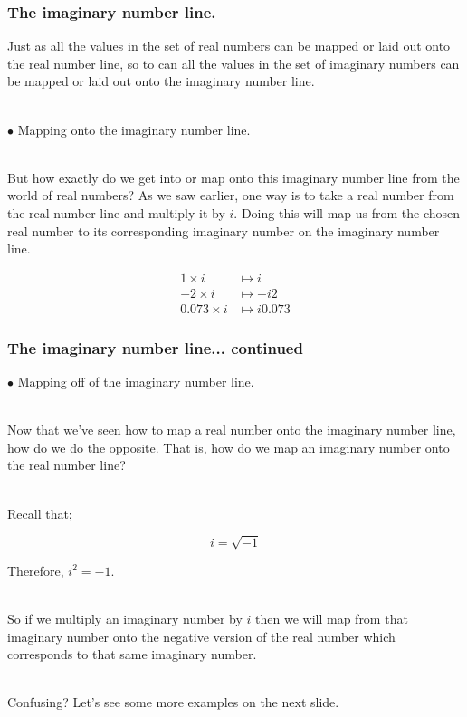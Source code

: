 \begin{frame}
\frametitle{The imaginary number line.}

Just as all the values in the set of real numbers can be mapped or laid out onto the real number line, so to can all the values in the set of imaginary numbers
can be mapped or laid out onto the imaginary number line.\\~\

\(\bullet\) Mapping onto the imaginary number line.\\~

But how exactly do we get into or map onto this imaginary number line from the world of real numbers? As we saw earlier, one way is to take a real number from
the real number line and multiply it by \(i\). Doing this will map us from the chosen real number to its corresponding imaginary number on the
imaginary number line.

\begin{align*}
1 \times i     &\mapsto i \\
-2 \times i    &\mapsto -i2 \\
0.073 \times i &\mapsto i0.073
\end{align*}

\end{frame}


\begin{frame}
\frametitle{The imaginary number line... continued}

\(\bullet\) Mapping off of the imaginary number line.\\~

Now that we've seen how to map a real number onto the imaginary number line, how do we do the opposite. That is, how do we map an imaginary number onto the
real number line?\\~\

Recall that;

\begin{equation}
i = \sqrt{-1}
\end{equation}

Therefore, \(i^{2} = -1\).\\~\

So if we multiply an imaginary number by \(i\) then we will map from that imaginary number onto the negative version of the real number which corresponds to
that same imaginary number.\\~\

Confusing? Let's see some more examples on the next slide.

\end{frame}


